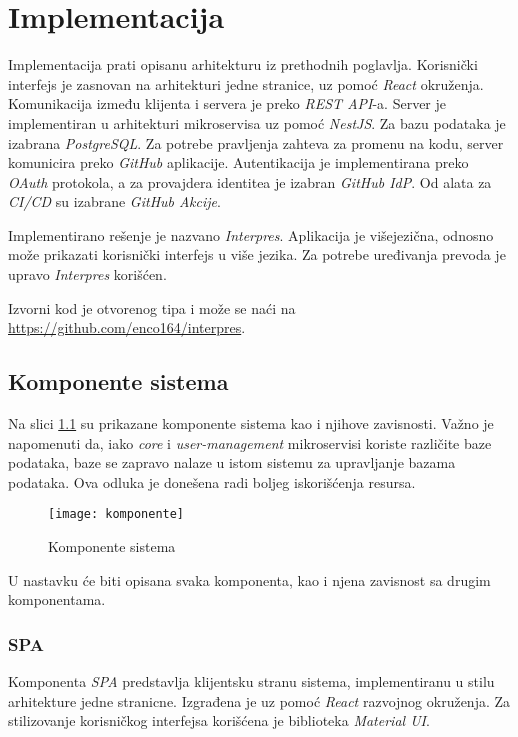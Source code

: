 \chapter{Implementacija}\label{ch:impl}

Implementacija prati opisanu arhitekturu iz prethodnih poglavlja. 
Korisnički interfejs je zasnovan na arhitekturi jedne stranice, 
uz pomoć \textit{React} okruženja. Komunikacija između klijenta i servera 
je preko \textit{REST API}-a. Server je implementiran u arhitekturi
mikroservisa uz pomoć \textit{NestJS}. Za bazu podataka 
je izabrana \textit{PostgreSQL}. Za potrebe pravljenja zahteva za promenu 
na kodu, server komunicira preko \textit{GitHub} aplikacije. Autentikacija 
je implementirana preko \textit{OAuth} protokola, a za provajdera 
identitea je izabran \textit{GitHub IdP}. Od alata za \textit{CI/CD} su izabrane 
\textit{GitHub Akcije}. 

Implementirano rešenje je nazvano \textit{Interpres}. Aplikacija je 
višejezična, odnosno može prikazati korisnički interfejs u više 
jezika. Za potrebe uređivanja prevoda je upravo \textit{Interpres} korišćen.

Izvorni kod je otvorenog tipa i može se naći na \url{https://github.com/enco164/interpres}.

\section{Komponente sistema}

Na slici \ref{fig:komponente} su prikazane komponente sistema kao i
njihove zavisnosti. Važno je napomenuti da, iako \textit{core} i 
\textit{user-management} mikroservisi koriste različite baze podataka,
baze se zapravo nalaze u istom sistemu za upravljanje bazama podataka. 
Ova odluka je donešena radi boljeg iskorišćenja resursa. 

\begin{figure}[h]
  \centering
  \texttt{[image: komponente]}
  \caption{Komponente sistema}
  \label{fig:komponente}
\end{figure}

U nastavku će biti opisana svaka komponenta, kao i njena 
zavisnost sa drugim komponentama.

\subsection{SPA}
Komponenta \textit{SPA} predstavlja klijentsku stranu sistema, implementiranu 
u stilu arhitekture jedne stranicne. Izgrađena je 
uz pomoć \textit{React} razvojnog okruženja. Za stilizovanje korisničkog 
interfejsa korišćena je biblioteka \textit{Material UI}. 

